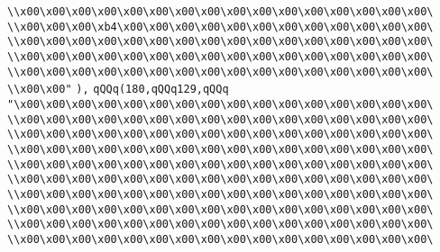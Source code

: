 \verb|\\x00\x00\x00\x00\x00\x00\x00\x00\x00\x00\x00\x00\x00\x00\x00\x00\|\newline
\verb|\\x00\x00\x00\xb4\x00\x00\x00\x00\x00\x00\x00\x00\x00\x00\x00\x00\|\newline
\verb|\\x00\x00\x00\x00\x00\x00\x00\x00\x00\x00\x00\x00\x00\x00\x00\x00\|\newline
\verb|\\x00\x00\x00\x00\x00\x00\x00\x00\x00\x00\x00\x00\x00\x00\x00\x00\|\newline
\verb|\\x00\x00\x00\x00\x00\x00\x00\x00\x00\x00\x00\x00\x00\x00\x00\x00\|\newline
\verb|\\x00\x00"|\newline
\verb|),|\newline
\verb|qQQq(180,qQQq129,qQQq|\newline
\verb|"\x00\x00\x00\x00\x00\x00\x00\x00\x00\x00\x00\x00\x00\x00\x00\x00\|\newline
\verb|\\x00\x00\x00\x00\x00\x00\x00\x00\x00\x00\x00\x00\x00\x00\x00\x00\|\newline
\verb|\\x00\x00\x00\x00\x00\x00\x00\x00\x00\x00\x00\x00\x00\x00\x00\x00\|\newline
\verb|\\x00\x00\x00\x00\x00\x00\x00\x00\x00\x00\x00\x00\x00\x00\x00\x00\|\newline
\verb|\\x00\x00\x00\x00\x00\x00\x00\x00\x00\x00\x00\x00\x00\x00\x00\x00\|\newline
\verb|\\x00\x00\x00\x00\x00\x00\x00\x00\x00\x00\x00\x00\x00\x00\x00\x00\|\newline
\verb|\\x00\x00\x00\x00\x00\x00\x00\x00\x00\x00\x00\x00\x00\x00\x00\x00\|\newline
\verb|\\x00\x00\x00\x00\x00\x00\x00\x00\x00\x00\x00\x00\x00\x00\x00\x00\|\newline
\verb|\\x00\x00\x00\x00\x00\x00\x00\x00\x00\x00\x00\x00\x00\x00\x00\x00\|\newline
\verb|\\x00\x00\x00\x00\x00\x00\x00\x00\x00\x00\x00\x00\x00\x00\x00\x00\|\newline
